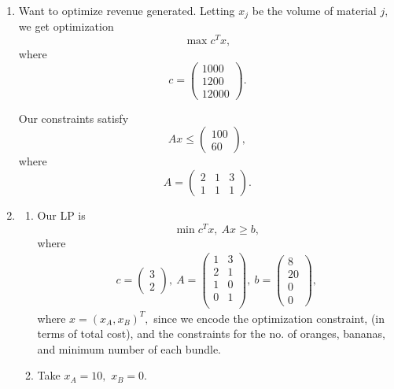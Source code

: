 \documentclass[12pt]{article}
\begin{document}
\begin{enumerate}
  \item Want to optimize revenue generated. Letting $x_j$ be the
    volume of material $j,$ we get optimization $$\max c^Tx,$$
    where $$c =
    \begin{pmatrix}
      1000 \\
      1200 \\
      12000
    \end{pmatrix}.$$

    Our constraints satisfy
    $$
    Ax \leq
    \begin{pmatrix}
      100 \\
      60
    \end{pmatrix},
    $$
    where $$A =
    \begin{pmatrix}
      2 & 1 & 3 \\
      1 & 1 & 1
    \end{pmatrix}.$$

  \item
    \begin{enumerate}
      \item Our LP is
        $$
        \min c^T x, \ Ax \geq b,
        $$
        where
        \begin{align*}
          c =
          \begin{pmatrix}
            3 \\
            2
          \end{pmatrix}, \ A =
          \begin{pmatrix}
            1 & 3 \\
            2 & 1 \\
            1 & 0 \\
            0 & 1 \\
          \end{pmatrix}, \ b =
          \begin{pmatrix}
            8 \\
            20 \\
            0 \\
            0
          \end{pmatrix},
        \end{align*}
        where $x = (x_A, x_B)^T,$ since we encode the optimization
        constraint, (in terms of total cost), and the constraints for
        the no. of oranges, bananas, and minimum number of each bundle.

      \item Take $x_A = 10,$ $x_B = 0.$


\end{enumerate}
\end{enumerate}
\end{document}
